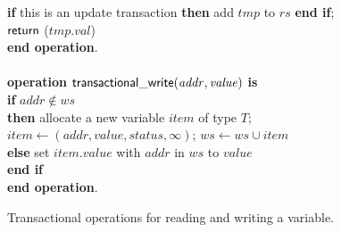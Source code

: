 \documentclass[11pt,letterpaper]{article}
\begin{document}
\begin{figure}
{{\begin{minipage}[t]{150mm}
\begin{tabbing}
 \> {\bf if} this is an update transaction 
                        {\bf then} add $\mathit{tmp}$ to $\mathit{rs}$ {\bf end if}; \\
 \> ${\sf return}$ ($\mathit{tmp.val}$) \\
{\bf end operation}. \\
\\
{\bf operation}  ${\sf transactional\_write}(\mathit{addr, value})$ {\bf is}\\
 \> {\bf if} $\mathit{addr} \not\in \mathit{ws}$  \\
 \>\> {\bf then} \> allocate a new variable $item$ of type $T$; \\
 \>\>\> $\mathit{item}  \gets (\mathit{addr, value, status, \infty})$; 
                   $\mathit{ws} \gets \mathit{ws} \cup \mathit{item}$ \\
 \>\> {\bf else} \> set $\mathit{item.value}$ with $\mathit{addr}$ in $\mathit{ws}$ to $\mathit{value}$ \\
 \> {\bf end if} \\
{\bf end operation}.
\end{tabbing}
\normalsize
\end{minipage}
}
\caption{Transactional operations for reading and writing a variable.}
\label{fig:tops}
}
\end{figure}
\end{document}
